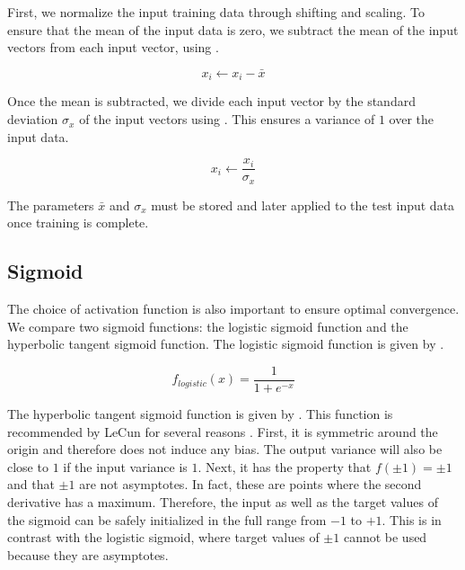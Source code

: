 \documentclass[journal,hidelinks]{IEEEtran}
\begin{document}
First, we normalize the input training data through shifting and scaling. To ensure that the mean of the input data is zero, we subtract the mean of the input vectors from each input vector, using .

\begin{equation} \label{eq:normalization_mean}
x_i \leftarrow x_i - \bar{x}
\end{equation}

Once the mean is subtracted, we divide each input vector by the standard deviation $\sigma_x$ of the input vectors using . This ensures a variance of $1$ over the input data.

\begin{equation} \label{eq:normalization_variance}
x_i \leftarrow \frac{x_i}{\sigma_{x}}
\end{equation}

The parameters $\bar{x}$ and $\sigma_x$ must be stored and later applied to the test input data once training is complete.

\subsection{Sigmoid}

The choice of activation function is also important to ensure optimal convergence. We compare two sigmoid functions: the logistic sigmoid function and the hyperbolic tangent sigmoid function. The logistic sigmoid function is given by .

\begin{equation} \label{eq:sigmoid_logistic}
f_{logistic}(x) = \frac{1}{1 + e^{-x}}
\end{equation}

The hyperbolic tangent sigmoid function is given by . This function is recommended by LeCun for several reasons \cite{lecun_efficient_1998}. First, it is symmetric around the origin and therefore does not induce any bias. The output variance will also be close to $1$ if the input variance is $1$. Next, it has the property that $f(\pm1) = \pm1$ and that $\pm 1$ are not asymptotes. In fact, these are points where the second derivative has a maximum. Therefore, the input as well as the target values of the sigmoid can be safely initialized in the full range from $-1$ to $+1$. This is in contrast with the logistic sigmoid, where target values of $\pm1$ cannot be used because they are asymptotes.
\end{document}
